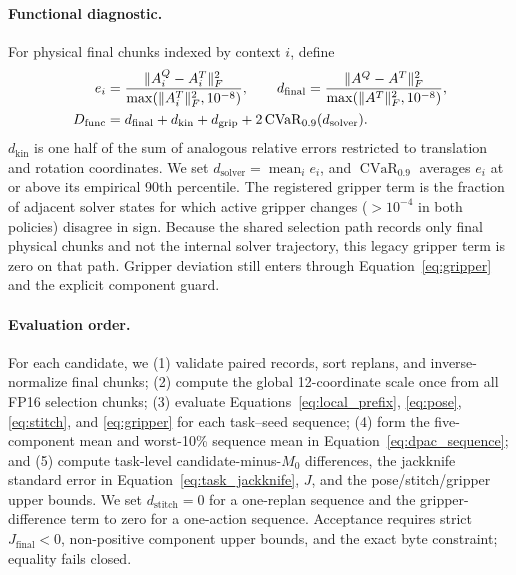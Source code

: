 \paragraph{Functional diagnostic.}
For physical final chunks indexed by context $i$, define
\begin{equation}
\begin{aligned}
 e_i&=\frac{\lVert A_i^Q-A_i^T\rVert_F^2}
 {\max(\lVert A_i^T\rVert_F^2,10^{-8})},\qquad
 d_{\mathrm{final}}=\frac{\lVert A^Q-A^T\rVert_F^2}
 {\max(\lVert A^T\rVert_F^2,10^{-8})},\\
 D_{\mathrm{func}}&=d_{\mathrm{final}}+d_{\mathrm{kin}}+d_{\mathrm{grip}}
 +2\operatorname{CVaR}_{0.9}(d_{\mathrm{solver}}).
\end{aligned}
\label{eq:dfunc_detail}
\end{equation}
$d_{\mathrm{kin}}$ is one half of the sum of analogous relative errors restricted to translation and rotation coordinates. We set $d_{\mathrm{solver}}=\operatorname{mean}_i e_i$, and $\operatorname{CVaR}_{0.9}$ averages $e_i$ at or above its empirical 90th percentile. The registered \dfunc gripper term is the fraction of adjacent solver states for which active gripper changes ($>10^{-4}$ in both policies) disagree in sign. Because the shared selection path records only final physical chunks and not the internal solver trajectory, this legacy \dfunc gripper term is zero on that path. Gripper deviation still enters \dpac through Equation~\ref{eq:gripper} and the explicit component guard.

\paragraph{Evaluation order.}
For each candidate, we (1) validate paired records, sort replans, and inverse-normalize final chunks; (2) compute the global 12-coordinate scale once from all FP16 selection chunks; (3) evaluate Equations~\ref{eq:local_prefix}, \ref{eq:pose}, \ref{eq:stitch}, and \ref{eq:gripper} for each task--seed sequence; (4) form the five-component mean and worst-10\% sequence mean in Equation~\ref{eq:dpac_sequence}; and (5) compute task-level candidate-minus-$M_0$ differences, the jackknife standard error in Equation~\ref{eq:task_jackknife}, $J$, and the pose/stitch/gripper upper bounds. We set $d_{\mathrm{stitch}}=0$ for a one-replan sequence and the gripper-difference term to zero for a one-action sequence. Acceptance requires strict $J_{\mathrm{final}}<0$, non-positive component upper bounds, and the exact byte constraint; equality fails closed.


